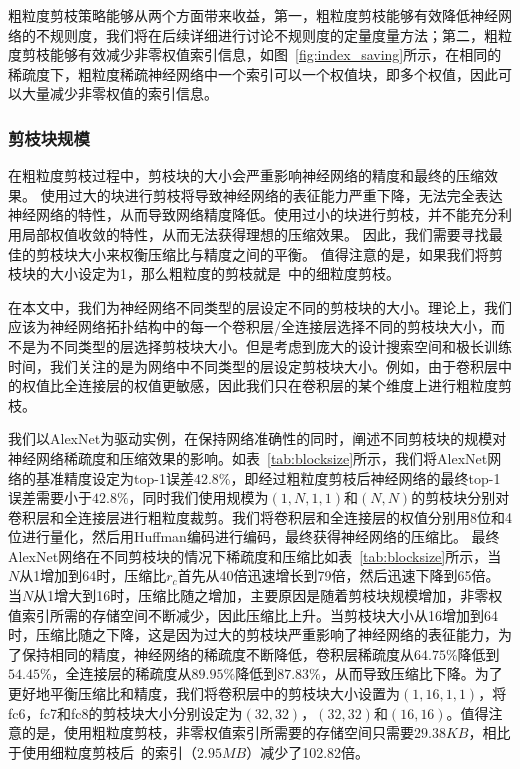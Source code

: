 粗粒度剪枝策略能够从两个方面带来收益，第一，粗粒度剪枝能够有效降低神经网络的不规则度，我们将在后续详细进行讨论不规则度的定量度量方法；第二，粗粒度剪枝能够有效减少非零权值索引信息，如图~\ref{fig:index_saving}所示，在相同的稀疏度下，粗粒度稀疏神经网络中一个索引可以一个权值块，即多个权值，因此可以大量减少非零权值的索引信息。


\subsubsection{剪枝块规模}

在粗粒度剪枝过程中，剪枝块的大小会严重影响神经网络的精度和最终的压缩效果。
使用过大的块进行剪枝将导致神经网络的表征能力严重下降，无法完全表达神经网络的特性，从而导致网络精度降低。使用过小的块进行剪枝，并不能充分利用局部权值收敛的特性，从而无法获得理想的压缩效果。
因此，我们需要寻找最佳的剪枝块大小来权衡压缩比与精度之间的平衡。
值得注意的是，如果我们将剪枝块的大小设定为1，那么粗粒度的剪枝就是~\cite{han2015learning}中的细粒度剪枝。

在本文中，我们为神经网络不同类型的层设定不同的剪枝块的大小。理论上，我们应该为神经网络拓扑结构中的每一个卷积层/全连接层选择不同的剪枝块大小，而不是为不同类型的层选择剪枝块大小。但是考虑到庞大的设计搜索空间和极长训练时间，我们关注的是为网络中不同类型的层设定剪枝块大小。例如，由于卷积层中的权值比全连接层的权值更敏感，因此我们只在卷积层的某个维度上进行粗粒度剪枝。

我们以AlexNet为驱动实例，在保持网络准确性的同时，阐述不同剪枝块的规模对神经网络稀疏度和压缩效果的影响。如表~\ref{tab:blocksize}所示，我们将AlexNet网络的基准精度设定为top-1误差$42.8\%$，即经过粗粒度剪枝后神经网络的最终top-1误差需要小于$42.8\%$，同时我们使用规模为$(1,N,1,1)$和$(N,N)$的剪枝块分别对卷积层和全连接层进行粗粒度裁剪。我们将卷积层和全连接层的权值分别用8位和4位进行量化，然后用Huffman编码进行编码，最终获得神经网络的压缩比。
最终AlexNet网络在不同剪枝块的情况下稀疏度和压缩比如表~\ref{tab:blocksize}所示，当$N$从1增加到64时，压缩比$r_c$首先从40倍迅速增长到79倍，然后迅速下降到65倍。当$N$从1增大到16时，压缩比随之增加，主要原因是随着剪枝块规模增加，非零权值索引所需的存储空间不断减少，因此压缩比上升。当剪枝块大小从16增加到64时，压缩比随之下降，这是因为过大的剪枝块严重影响了神经网络的表征能力，为了保持相同的精度，神经网络的稀疏度不断降低，卷积层稀疏度从$64.75\%$降低到$54.45\%$，全连接层的稀疏度从$89.95\%$降低到$87.83\%$，从而导致压缩比下降。为了更好地平衡压缩比和精度，我们将卷积层中的剪枝块大小设置为$(1,16,1,1)$，将fc6，fc7和fc8的剪枝块大小分别设定为$(32,32)$，$(32,32)$和$(16,16)$。值得注意的是，使用粗粒度剪枝，非零权值索引所需要的存储空间只需要$29.38KB$，相比于使用细粒度剪枝后~\cite{han2015deep}的索引（$2.95MB$）减少了102.82倍。

